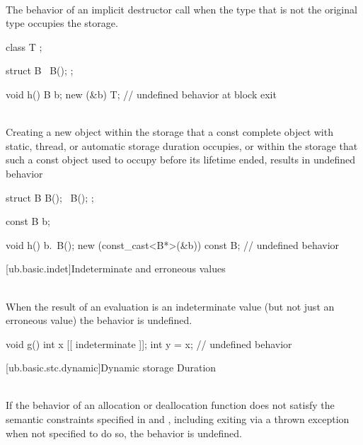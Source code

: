 \pnum
{} \\
The behavior of an implicit destructor call when the type that is not
the original type occupies the storage.

\pnum
\begin{example}
\begin{codeblock}
class T {};

struct B {
  ~B();
};

void h() {
  B b;
  new (&b) T;
}               // undefined behavior at block exit
\end{codeblock}
\end{example}


\pnum
{} \\
Creating a new object within the storage that a const complete object with static, thread, or automatic
storage duration occupies, or within the storage that such a const object used to occupy before its lifetime
ended, results in undefined behavior

\pnum
\begin{example}
\begin{codeblock}
struct B {
  B();
  ~B();
};

const B b;

void h() {
  b.~B();
  new (const_cast<B*>(&b)) const B; // undefined behavior
}
\end{codeblock}
\end{example}

[ub.basic.indet]{Indeterminate and erroneous values}

\pnum
{} \\
When the result of an evaluation is
an indeterminate value
(but not just an erroneous value)
the behavior is undefined.

\pnum
\begin{example}
\begin{codeblock}
void g() {
  int x [[ indeterminate ]];
  int y = x;    // undefined behavior
}
\end{codeblock}
\end{example}

[ub.basic.stc.dynamic]{Dynamic storage Duration}

\pnum
{} \\
If the behavior of an allocation or deallocation function does not satisfy the semantic constraints
specified
in  and ,
including exiting via a thrown exception when not specified to do so,
the behavior is undefined.


